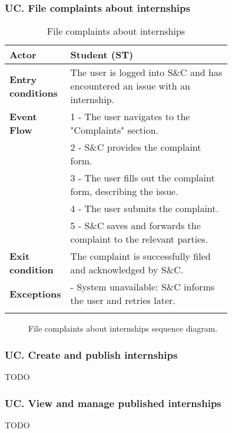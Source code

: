 \subsubsection*{UC\cuc . File complaints about internships}
\begin{center}
    \begin{longtable}{|l|p{0.75\linewidth}|}
        \hline
        \textbf{Actor}            & Student (ST) \\
        \hline
        \textbf{Entry conditions} & The user is logged into S\&C and has encountered an issue with an internship. \\
        \hline
        \textbf{Event Flow}       & 1 - The user navigates to the "Complaints" section. \\
        & 2 - S\&C provides the complaint form. \\
        & 3 - The user fills out the complaint form, describing the issue. \\
        & 4 - The user submits the complaint. \\
        & 5 - S\&C saves and forwards the complaint to the relevant parties. \\
        \hline
        \textbf{Exit condition}   & The complaint is successfully filed and acknowledged by S\&C. \\       
        \hline
        \textbf{Exceptions}       & - System unavailable: S\&C informs the user and retries later. \\
        \hline
        \caption{File complaints about internships}
        \label{tab:file_complaints_usecase}
    \end{longtable}
\end{center}

\begin{figure}[H]
    \begin{center}
        
        \caption{File complaints about internships sequence diagram.}
        \label{fig:file_complaints_seqd}%
    \end{center}
\end{figure}

\subsubsection*{UC\cuc . Create and publish internships}
TODO

\subsubsection*{UC\cuc . View and manage published internships}
TODO

